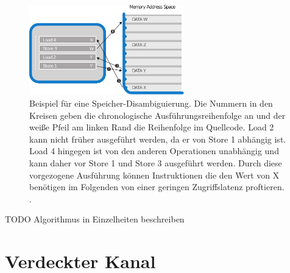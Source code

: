 \begin{figure}[h]
\label{fig:MemoryDisambiguation}
\centering
\includegraphics[width=0.6\textwidth]{methods/memory_disambiguation.pdf}
\caption{Beispiel für eine Speicher-Disambiguierung. Die Nummern in den Kreisen geben die chronologische Ausführungsreihenfolge an und der weiße Pfeil am linken Rand die Reihenfolge im Quellcode. Load 2 kann nicht früher ausgeführt werden, da er von Store 1 abhängig ist. Load 4 hingegen ist von den anderen Operationen unabhängig und kann daher vor Store 1 und Store 3 ausgeführt werden. Durch diese vorgezogene Ausführung können Instruktionen die den Wert von X benötigen im Folgenden von einer geringen Zugriffslatenz proftieren. \cite{CacheAssoWiki}.}


\end{figure}

\newtextend

TODO Algorithmus in Einzelheiten beschreiben


\section{Verdeckter Kanal}

